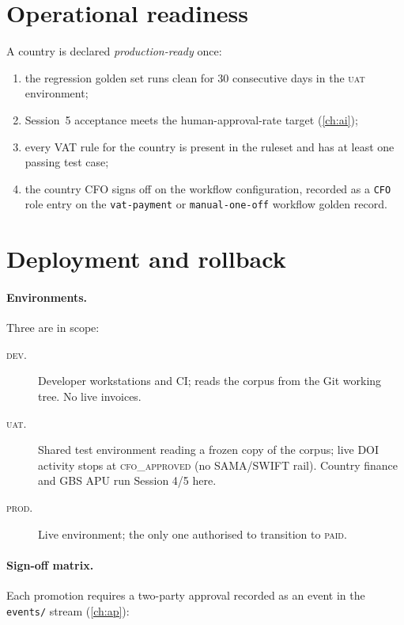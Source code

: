 \documentclass[11pt,a4paper,twoside]{report}
\begin{document}
\section{Operational readiness}

A country is declared \emph{production-ready} once:
\begin{enumerate}
  \item the regression golden set runs clean for 30 consecutive days
        in the \textsc{uat} environment;
  \item Session~5 acceptance meets the human-approval-rate target
        (\cref{ch:ai});
  \item every VAT rule for the country is present in the ruleset and
        has at least one passing test case;
  \item the country CFO signs off on the workflow configuration,
        recorded as a \texttt{CFO} role entry on the \texttt{vat-payment}
        or \texttt{manual-one-off} workflow golden record.
\end{enumerate}

\section{Deployment and rollback}

\paragraph{Environments.} Three are in scope:
\begin{description}
  \item[\textsc{dev}.] Developer workstations and CI; reads the corpus
        from the Git working tree. No live invoices.
  \item[\textsc{uat}.] Shared test environment reading a frozen copy of
        the corpus; live DOI activity stops at \textsc{cfo\_approved}
        (no SAMA/SWIFT rail). Country finance and GBS APU run Session
        4/5 here.
  \item[\textsc{prod}.] Live environment; the only one authorised to
        transition to \textsc{paid}.
\end{description}

\paragraph{Sign-off matrix.} Each promotion requires a two-party
approval recorded as an event in the \texttt{events/} stream
(\cref{ch:ap}):
\end{document}
